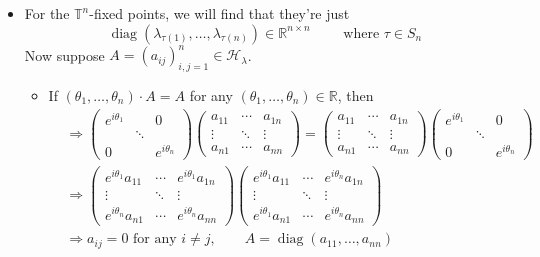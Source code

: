 \documentclass[11pt]{amsart}
\numberwithin{equation}{section}
\theoremstyle{plain}
\theoremstyle{plain}
\numberwithin{equation}{section}
\theoremstyle{remark}
\DeclareMathOperator{\diag}{diag}
\begin{document}
\begin{itemize}
	\item For the $\mathbb{T}^n$-fixed points, we will find that they're just $$\diag(\lambda_{\tau(1)},\ldots,\lambda_{\tau(n)}) \in \mathbb{R}^{n\times n} \qquad\text{ where } \tau \in S_n$$
	Now suppose $A=(a_{ij})_{i,j=1}^n \in \mathcal{H}_\lambda$.
	\begin{itemize}
		\item If $(\theta_1,\ldots, \theta_n)\cdot A=A$ for any $(\theta_1,\ldots, \theta_n) \in \mathbb{R}$, then
		\begin{equation*}
		\begin{aligned}
			&\Rightarrow \begin{pmatrix}
			e^{i\theta_1}&&0\\
			&\ddots&\\
			0&&e^{i\theta_n}
			\end{pmatrix}
			\begin{pmatrix}
			a_{11}&\cdots&a_{1n}\\
			\vdots&\ddots&\vdots\\
			a_{n1}&\cdots&a_{nn}
			\end{pmatrix}=
			\begin{pmatrix}
			a_{11}&\cdots&a_{1n}\\
			\vdots&\ddots&\vdots\\
			a_{n1}&\cdots&a_{nn}
			\end{pmatrix}
			\begin{pmatrix}
			e^{i\theta_1}&&0\\
			&\ddots&\\
			0&&e^{i\theta_n}
			\end{pmatrix}\\
			&\Rightarrow
			\begin{pmatrix}
			e^{i\theta_1}a_{11}&\cdots&e^{i\theta_1}a_{1n}\\
			\vdots&\ddots&\vdots\\
			e^{i\theta_n}a_{n1}&\cdots&e^{i\theta_n}a_{nn}
			\end{pmatrix}
			\begin{pmatrix}
			e^{i\theta_1}a_{11}&\cdots&e^{i\theta_n}a_{1n}\\
			\vdots&\ddots&\vdots\\
			e^{i\theta_1}a_{n1}&\cdots&e^{i\theta_n}a_{nn}
			\end{pmatrix}\\
			&\Rightarrow a_{ij}=0 \text{ for any } i \neq j, \qquad A=\diag (a_{11}, \ldots, a_{nn})\\

\end{aligned}
\end{equation*}
\end{itemize}
\end{itemize}
\end{document}
